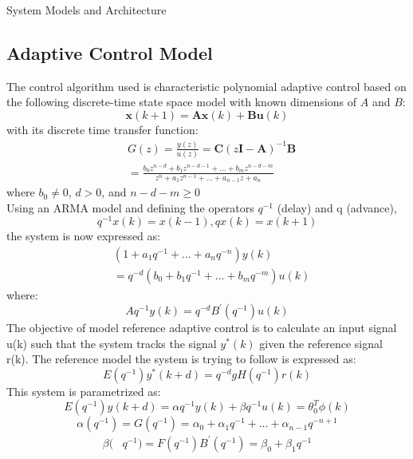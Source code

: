\begin{section}{System Models and Architecture}
\subsection{Adaptive Control Model}
The control algorithm used is characteristic polynomial adaptive control based on the following discrete-time state space model with known dimensions of $A$ and $B$:
	\begin{equation}
	\bm{x}(k+1) = \bm{A}\bm{x}(k) + \bm{B}\bm{u}(k)
	\end{equation}
with its discrete time transfer function:
	\begin{align}
        & G(z) = \frac{y(z)}{u(z)} = \bm{C}(z\bm{I}-\bm{A})^{-1}\bm{B} \nonumber \\ 
	& = \frac{b_0z^{n-d}+b_1z^{n-d-1} +...+b_mz^{n-d-m}}{z^{n}+a_1z^{n-1}+...+a_{n-1}z+a_n}
	\end{align}
where $b_0\ne{0}$, $d>0$, and $n-d-m\geq{0}$\\
Using an ARMA model and defining the operators $q^{-1}$ (delay) and q (advance),
	\begin{equation}
	q^{-1}x(k) = x(k-1), qx(k) = x(k+1)
	\end{equation}
the system is now expressed as:
	\begin{align}
	& (1+a_1q^{-1}+...+a_nq^{-n})y(k) \nonumber \\
	& =q^{-d}(b_0+b_1q^{-1}+...+b_mq^{-m})u(k)
	\end{align}
where:
	\begin{equation}
	Aq^{-1}y(k)=q^{-d}B^{'}(q^{-1})u(k)
	\end{equation}
The objective of model reference adaptive control is to calculate an input signal u(k) such that the system tracks the signal $y^{*}(k)$ given the reference signal r(k). The reference model the system is trying to follow is expressed as:
	\begin{equation}
	E(q^{-1})y^*(k+d)=q^{-d}gH(q^{-1})r(k)
	\end{equation}
This system is parametrized as:
	\begin{equation}
	E(q^{-1})y(k+d)={\alpha}q^{-1}y(k) + {\beta}q^{-1}u(k)=\theta_0^T\phi(k)
	\end{equation}
	\begin{equation}
	\alpha(q^{-1})=G(q^{-1})=\alpha_0+\alpha_1q^{-1}+ \dots +\alpha_{n-1}q^{-n+1}
	\end{equation}
	\begin{align}
	\beta( & q^{-1})=F(q^{-1})B^{'}(q^{-1})=\beta_0+\beta_1q^{-1} \nonumber \\

\end{align}
\end{section}
